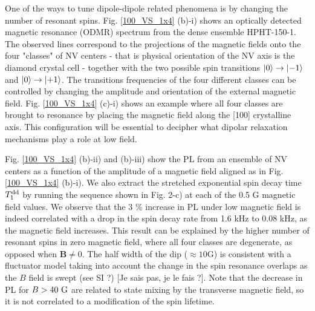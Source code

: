 \documentclass[preprintnumbers,amsmath,amssymb,superscriptaddress,twocolumn,showpacs]{revtex4-2}
\begin{document}

One of the ways to tune dipole-dipole related phenomena is by changing the number of resonant spins. Fig. \ref{100_VS_1x4} (b)-i) shows an optically detected magnetic resonance (ODMR) spectrum from the dense ensemble HPHT-150-1. The observed lines correspond to the projections of the magnetic fields onto the four "classes" of NV centers - that is physical orientation of the NV axis is the diamond crystal cell - together with the two possible spin transitions $\ket{0}\to\ket{-1}$ and $\ket{0}\to\ket{+1}$. The transitions frequencies of the four different classes can be controlled by changing the amplitude and orientation of the external magnetic field. Fig. \ref{100_VS_1x4} (c)-i) shows an example where all four classes are brought to resonance by placing the magnetic field along the [100] crystalline axis. 
This configuration will be essential to decipher what dipolar relaxation mechanisms play a role at low field. 

Fig. \ref{100_VS_1x4} (b)-ii) and (b)-iii) show the PL from an ensemble of NV centers as a function of the amplitude of a magnetic field aligned as in Fig. \ref{100_VS_1x4} (b)-i). 
We also extract the stretched exponential spin decay time $T_1^{\rm dd}$ by running the sequence shown in Fig. 2-c) at each of the 0.5 G magnetic field values. 
We observe that the 3 \% increase in PL under low magnetic field is indeed correlated with a drop in the spin decay rate from 1.6 kHz to 0.08 kHz, as the magnetic field increases. This result can be explained by the higher number of resonant spins in zero magnetic field, where all four classes are degenerate, as opposed when $\bm B \neq 0$. The half width of the dip ($\approx 10$G) is consistent with a fluctuator model taking into account the change in the spin resonance overlaps as the $B$ field is swept (see SI ?) [Je sais pas, je le fais ?].
Note that the decrease in PL for $B>40\ \rm G$ are related to state mixing by the transverse magnetic field, so it is not correlated to a modification of the spin lifetime. 
\end{document}
